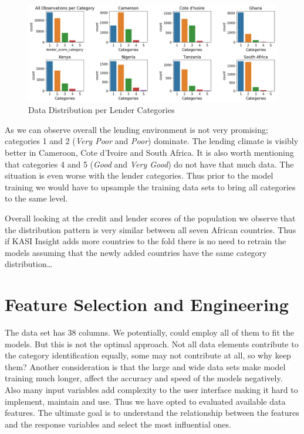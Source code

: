 \begin{Schunk}
\begin{figure}[H]

{\centering \includegraphics[width=1.15\linewidth]{../../artifacts/lcategories} 

}

\caption[Data Distribution per Lender Categories]{Data Distribution per Lender Categories}\label{fig:dl}
\end{figure}
\end{Schunk}

As we can observe overall the lending environment is not very promising;
categories 1 and 2 (\emph{Very Poor} and \emph{Poor}) dominate. The
lending climate is visibly better in Cameroon, Cote d'Ivoire and South
Africa. It is also worth mentioning that categories 4 and 5 (\emph{Good}
and \emph{Very Good}) do not have that much data. The situation is even
worse with the lender categories. Thus prior to the model training we
would have to upsample the training data sets to bring all categories to
the same level.

Overall looking at the credit and lender scores of the population we
observe that the distribution pattern is very similar between all seven
African countries. Thus if KASI Insight adds more countries to the fold
there is no need to retrain the models assuming that the newly added
countries have the same category distribution\ldots{}

\hypertarget{feature-selection-and-engineering}{%
\section{Feature Selection and
Engineering}\label{feature-selection-and-engineering}}

The data set has 38 columns. We potentially, could employ all of them to
fit the models. But this is not the optimal approach. Not all data
elements contribute to the category identification equally, some may not
contribute at all, so why keep them? Another consideration is that the
large and wide data sets make model training much longer, affect the
accuracy and speed of the models negatively. Also many input variables
add complexity to the user interface making it hard to implement,
maintain and use. Thus we have opted to evaluated available data
features. The ultimate goal is to understand the relationship between
the features and the response variables and select the most influential
ones.

